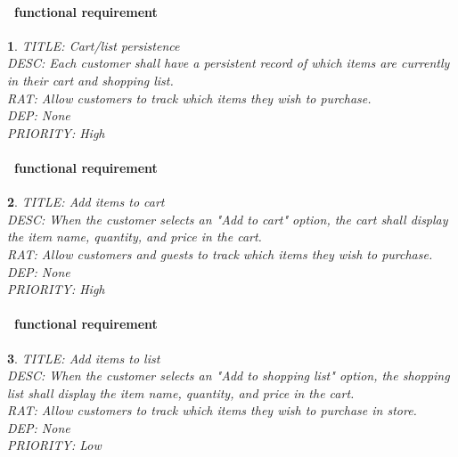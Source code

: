 \documentclass{scrreprt}
\theoremstyle{funreq}
\newtheorem{funreq}{}
\begin{document}
	\paragraph[]{\Subsectionname ~functional requirement }
	\begin{funreq}
		\label{cart_persist}
		TITLE: Cart/list persistence\\
		DESC: Each customer shall have a persistent record of which items are currently in their cart and shopping list.\\
		RAT: Allow customers to track which items they wish to purchase.\\
		DEP: None\\
		PRIORITY: High\\
	\end{funreq}
	
	\paragraph[]{\Subsectionname ~functional requirement }
	\begin{funreq}
		\label{cart_add}
		TITLE: Add items to cart\\
		DESC: When the customer selects an "Add to cart" option, the cart shall display the item name, quantity, and price in the cart.\\
		RAT: Allow customers and guests to track which items they wish to purchase.\\
		DEP: None\\
		PRIORITY: High\\
	\end{funreq}

	\paragraph[]{\Subsectionname ~functional requirement }
\begin{funreq}
	\label{list_add}
	TITLE: Add items to list\\
	DESC: When the customer selects an "Add to shopping list" option, the shopping list shall display the item name, quantity, and price in the cart.\\
	RAT: Allow customers to track which items they wish to purchase in store.\\
	DEP: None\\
	PRIORITY: Low\\
\end{funreq}
\end{document}
